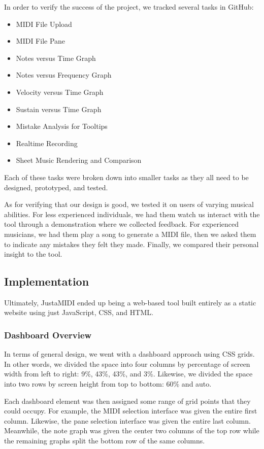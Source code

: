 \documentclass[journal]{vgtc}                %
\begin{document}
In order to verify the success of the project, we tracked several tasks in
GitHub:

\begin{itemize}
  \item MIDI File Upload
  \item MIDI File Pane
  \item Notes versus Time Graph
  \item Notes versus Frequency Graph
  \item Velocity versus Time Graph
  \item Sustain versus Time Graph
  \item Mistake Analysis for Tooltips
  \item Realtime Recording
  \item Sheet Music Rendering and Comparison
\end{itemize}

Each of these tasks were broken down into smaller tasks as they all need to be
designed, prototyped, and tested.

As for verifying that our design is good, we tested it on users of varying musical
abilities. For less experienced individuals, we had them watch us interact with
the tool through a demonstration where we collected feedback. For experienced
musicians, we had them play a song to generate a MIDI file, then we asked them
to indicate any mistakes they felt they made. Finally, we compared their
personal insight to the tool.

\subsection{Implementation}

Ultimately, JustaMIDI ended up being a web-based tool built entirely as a
static website using just JavaScript, CSS, and HTML.

\subsubsection{Dashboard Overview}

In terms of general design, we went with a dashboard approach using CSS grids.
In other words, we divided the space into four columns by percentage of screen
width from left to right: 9\%, 43\%, 43\%, and 3\%. Likewise, we divided
the space into two rows by screen height from top to bottom: 60\% and auto.

Each dashboard element was then assigned some range of grid points that they
could occupy. For example, the MIDI selection interface was given the entire
first column. Likewise, the pane selection interface was given the entire
last column. Meanwhile, the note graph was given the center two columns of
the top row while the remaining graphs split the bottom row of the same
columns.
\end{document}
